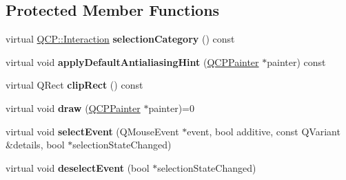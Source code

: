 \subsection*{\-Protected \-Member \-Functions}
\begin{DoxyCompactItemize}
\item 
\hypertarget{classQCPAbstractLegendItem_a53a80054ab329beaca072fb08c08944b}{virtual \hyperlink{namespaceQCP_a2ad6bb6281c7c2d593d4277b44c2b037}{\-Q\-C\-P\-::\-Interaction} {\bfseries selection\-Category} () const }\label{classQCPAbstractLegendItem_a53a80054ab329beaca072fb08c08944b}

\item 
\hypertarget{classQCPAbstractLegendItem_a71c3baeda42ba78d2cccd97e74110a5e}{virtual void {\bfseries apply\-Default\-Antialiasing\-Hint} (\hyperlink{classQCPPainter}{\-Q\-C\-P\-Painter} $\ast$painter) const }\label{classQCPAbstractLegendItem_a71c3baeda42ba78d2cccd97e74110a5e}

\item 
\hypertarget{classQCPAbstractLegendItem_abcb540c331b49ef7ee0ea1abbd0dcac3}{virtual \-Q\-Rect {\bfseries clip\-Rect} () const }\label{classQCPAbstractLegendItem_abcb540c331b49ef7ee0ea1abbd0dcac3}

\item 
\hypertarget{classQCPAbstractLegendItem_a97dedc084c672359710f16b31d046d1d}{virtual void {\bfseries draw} (\hyperlink{classQCPPainter}{\-Q\-C\-P\-Painter} $\ast$painter)=0}\label{classQCPAbstractLegendItem_a97dedc084c672359710f16b31d046d1d}

\item 
\hypertarget{classQCPAbstractLegendItem_abcfe9e335d99c7fac74e03d26723c1b7}{virtual void {\bfseries select\-Event} (\-Q\-Mouse\-Event $\ast$event, bool additive, const \-Q\-Variant \&details, bool $\ast$selection\-State\-Changed)}\label{classQCPAbstractLegendItem_abcfe9e335d99c7fac74e03d26723c1b7}

\item 
\hypertarget{classQCPAbstractLegendItem_ae64e667e7c5b85cd92c9b91928faef28}{virtual void {\bfseries deselect\-Event} (bool $\ast$selection\-State\-Changed)}\label{classQCPAbstractLegendItem_ae64e667e7c5b85cd92c9b91928faef28}

\end{DoxyCompactItemize}
